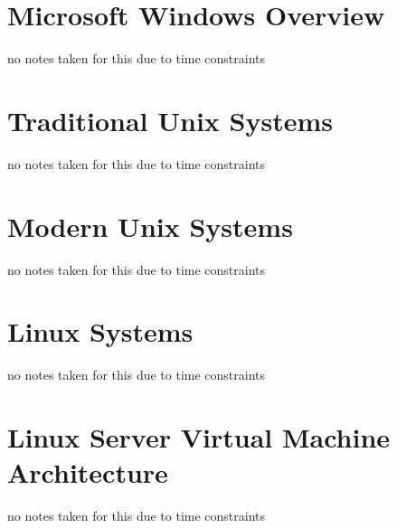 \documentclass[12pt]{article}
\begin{document}
\section{Microsoft Windows Overview}
no notes taken for this due to time constraints


\section{Traditional Unix Systems}
no notes taken for this due to time constraints

\section{Modern Unix Systems}
no notes taken for this due to time constraints

\section{Linux Systems}
no notes taken for this due to time constraints

\section{Linux Server Virtual Machine Architecture}
no notes taken for this due to time constraints
\end{document}
